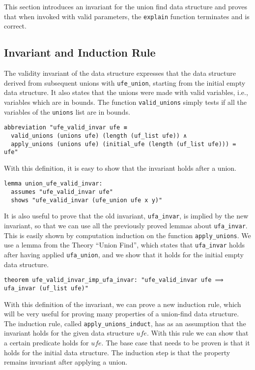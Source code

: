 This section introduces an invariant for the union find data structure and proves that  when invoked with valid parameters, the \lstinline{explain} function terminates and is correct.

\subsection{Invariant and Induction Rule}

The validity invariant of the data structure expresses that the data structure derived from subsequent unions with \lstinline{ufe_union}, starting from the initial empty data structure.
It also states that the unions were made with valid variables, i.e., variables which are in bounds.
The function \lstinline|valid_unions| simply tests if all the variables of the \lstinline|unions| list are in bounds.

\begin{lstlisting}
abbreviation "ufe_valid_invar ufe ≡
  valid_unions (unions ufe) (length (uf_list ufe)) ∧
  apply_unions (unions ufe) (initial_ufe (length (uf_list ufe))) = ufe"
\end{lstlisting}

With this definition, it is easy to show that the invariant holds after a union.

\begin{lstlisting}
lemma union_ufe_valid_invar:
  assumes "ufe_valid_invar ufe"
  shows "ufe_valid_invar (ufe_union ufe x y)"
\end{lstlisting}

It is also useful to prove that the old invariant, \lstinline{ufa_invar}, is implied by the new invariant, so that we can use all the previously proved lemmas about \lstinline{ufa_invar}. This is easily shown by computation induction on the function \lstinline{apply_unions}. We use a lemma from the Theory ``Union Find'', which states that \lstinline{ufa_invar} holds after having applied \lstinline{ufa_union}, and we show that it holds for the initial empty data structure.

\begin{lstlisting}
theorem ufe_valid_invar_imp_ufa_invar: "ufe_valid_invar ufe ⟹ ufa_invar (uf_list ufe)"
\end{lstlisting}

With this definition of the invariant, we can prove a new induction rule, which will be very useful for proving many properties of a union-find data structure. The induction rule, called \lstinline{apply_unions_induct}, has as an assumption that the invariant holds for the given data structure $ufe$. With this rule we can show that a certain predicate holds for $ufe$. The base case that needs to be proven is that it holds for the initial data structure. The induction step is that the property remains invariant after applying a union.

